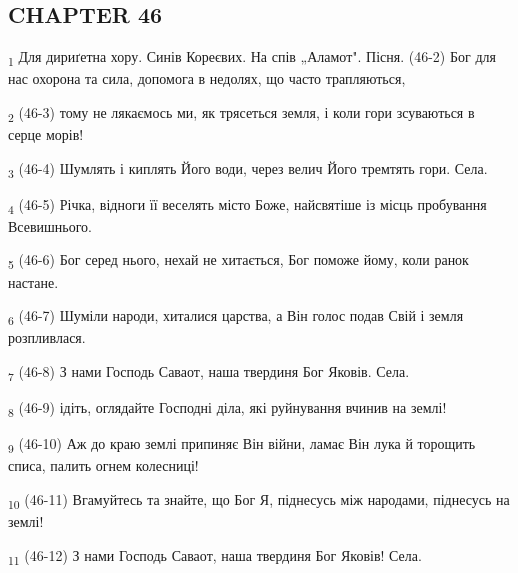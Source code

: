 \subsection{CHAPTER 46}
\begin{tcolorbox}
\textsubscript{1} Для дириґетна хору. Синів Кореєвих. На спів „Аламот". Пісня. (46-2) Бог для нас охорона та сила, допомога в недолях, що часто трапляються,
\end{tcolorbox}
\begin{tcolorbox}
\textsubscript{2} (46-3) тому не лякаємось ми, як трясеться земля, і коли гори зсуваються в серце морів!
\end{tcolorbox}
\begin{tcolorbox}
\textsubscript{3} (46-4) Шумлять і киплять Його води, через велич Його тремтять гори. Села.
\end{tcolorbox}
\begin{tcolorbox}
\textsubscript{4} (46-5) Річка, відноги її веселять місто Боже, найсвятіше із місць пробування Всевишнього.
\end{tcolorbox}
\begin{tcolorbox}
\textsubscript{5} (46-6) Бог серед нього, нехай не хитається, Бог поможе йому, коли ранок настане.
\end{tcolorbox}
\begin{tcolorbox}
\textsubscript{6} (46-7) Шуміли народи, хиталися царства, а Він голос подав Свій і земля розпливлася.
\end{tcolorbox}
\begin{tcolorbox}
\textsubscript{7} (46-8) З нами Господь Саваот, наша твердиня Бог Яковів. Села.
\end{tcolorbox}
\begin{tcolorbox}
\textsubscript{8} (46-9) ідіть, оглядайте Господні діла, які руйнування вчинив на землі!
\end{tcolorbox}
\begin{tcolorbox}
\textsubscript{9} (46-10) Аж до краю землі припиняє Він війни, ламає Він лука й торощить списа, палить огнем колесниці!
\end{tcolorbox}
\begin{tcolorbox}
\textsubscript{10} (46-11) Вгамуйтесь та знайте, що Бог Я, піднесусь між народами, піднесусь на землі!
\end{tcolorbox}
\begin{tcolorbox}
\textsubscript{11} (46-12) З нами Господь Саваот, наша твердиня Бог Яковів! Села.
\end{tcolorbox}
